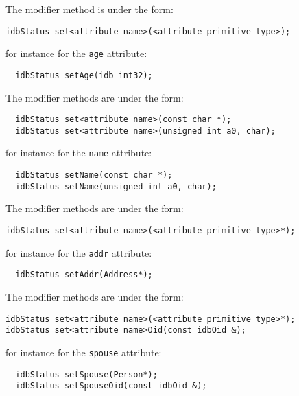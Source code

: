 The modifier method is under the form:
\verbsize
\begin{verbatim}
idbStatus set<attribute name>(<attribute primitive type>);
\end{verbatim}
\normalsize
for instance for the \texttt{age} attribute:
\verbsize
\begin{verbatim}
  idbStatus setAge(idb_int32);
\end{verbatim}
\normalsize
{}
The modifier methods are under the form:
\verbsize
\begin{verbatim}
  idbStatus set<attribute name>(const char *);
  idbStatus set<attribute name>(unsigned int a0, char);
\end{verbatim}
\normalsize
for instance for the \texttt{name} attribute:
\verbsize
\begin{verbatim}
  idbStatus setName(const char *);
  idbStatus setName(unsigned int a0, char);
\end{verbatim}
\normalsize

The modifier methods are under the form:
\verbsize
\begin{verbatim}
idbStatus set<attribute name>(<attribute primitive type>*);
\end{verbatim}
\normalsize
for instance for the \texttt{addr} attribute:
\verbsize
\begin{verbatim}
  idbStatus setAddr(Address*);
\end{verbatim}
\normalsize

The modifier methods are under the form:
\verbsize
\begin{verbatim}
idbStatus set<attribute name>(<attribute primitive type>*);
idbStatus set<attribute name>Oid(const idbOid &);
\end{verbatim}
\normalsize
for instance for the \texttt{spouse} attribute:
\verbsize
\begin{verbatim}
  idbStatus setSpouse(Person*);
  idbStatus setSpouseOid(const idbOid &);
\end{verbatim}
\normalsize

